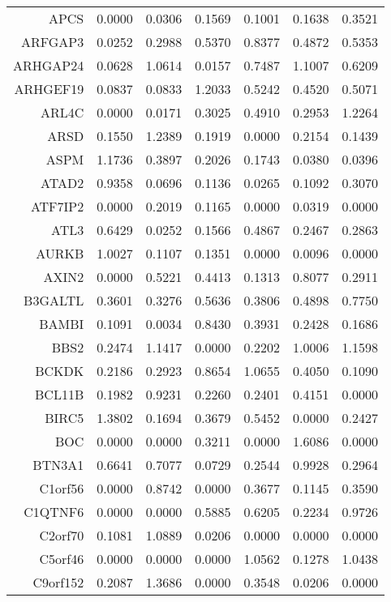 \begin{longtable}{rrrrrrr}
  APCS & 0.0000 & 0.0306 & 0.1569 & 0.1001 & 0.1638 & 0.3521 \\ 
  ARFGAP3 & 0.0252 & 0.2988 & 0.5370 & 0.8377 & 0.4872 & 0.5353 \\ 
  ARHGAP24 & 0.0628 & 1.0614 & 0.0157 & 0.7487 & 1.1007 & 0.6209 \\ 
  ARHGEF19 & 0.0837 & 0.0833 & 1.2033 & 0.5242 & 0.4520 & 0.5071 \\ 
  ARL4C & 0.0000 & 0.0171 & 0.3025 & 0.4910 & 0.2953 & 1.2264 \\ 
  ARSD & 0.1550 & 1.2389 & 0.1919 & 0.0000 & 0.2154 & 0.1439 \\ 
  ASPM & 1.1736 & 0.3897 & 0.2026 & 0.1743 & 0.0380 & 0.0396 \\ 
  ATAD2 & 0.9358 & 0.0696 & 0.1136 & 0.0265 & 0.1092 & 0.3070 \\ 
  ATF7IP2 & 0.0000 & 0.2019 & 0.1165 & 0.0000 & 0.0319 & 0.0000 \\ 
  ATL3 & 0.6429 & 0.0252 & 0.1566 & 0.4867 & 0.2467 & 0.2863 \\ 
  AURKB & 1.0027 & 0.1107 & 0.1351 & 0.0000 & 0.0096 & 0.0000 \\ 
  AXIN2 & 0.0000 & 0.5221 & 0.4413 & 0.1313 & 0.8077 & 0.2911 \\ 
  B3GALTL & 0.3601 & 0.3276 & 0.5636 & 0.3806 & 0.4898 & 0.7750 \\ 
  BAMBI & 0.1091 & 0.0034 & 0.8430 & 0.3931 & 0.2428 & 0.1686 \\ 
  BBS2 & 0.2474 & 1.1417 & 0.0000 & 0.2202 & 1.0006 & 1.1598 \\ 
  BCKDK & 0.2186 & 0.2923 & 0.8654 & 1.0655 & 0.4050 & 0.1090 \\ 
  BCL11B & 0.1982 & 0.9231 & 0.2260 & 0.2401 & 0.4151 & 0.0000 \\ 
  BIRC5 & 1.3802 & 0.1694 & 0.3679 & 0.5452 & 0.0000 & 0.2427 \\ 
  BOC & 0.0000 & 0.0000 & 0.3211 & 0.0000 & 1.6086 & 0.0000 \\ 
  BTN3A1 & 0.6641 & 0.7077 & 0.0729 & 0.2544 & 0.9928 & 0.2964 \\ 
  C1orf56 & 0.0000 & 0.8742 & 0.0000 & 0.3677 & 0.1145 & 0.3590 \\ 
  C1QTNF6 & 0.0000 & 0.0000 & 0.5885 & 0.6205 & 0.2234 & 0.9726 \\ 
  C2orf70 & 0.1081 & 1.0889 & 0.0206 & 0.0000 & 0.0000 & 0.0000 \\ 
  C5orf46 & 0.0000 & 0.0000 & 0.0000 & 1.0562 & 0.1278 & 1.0438 \\ 
  C9orf152 & 0.2087 & 1.3686 & 0.0000 & 0.3548 & 0.0206 & 0.0000 \\ 

\end{longtable}
